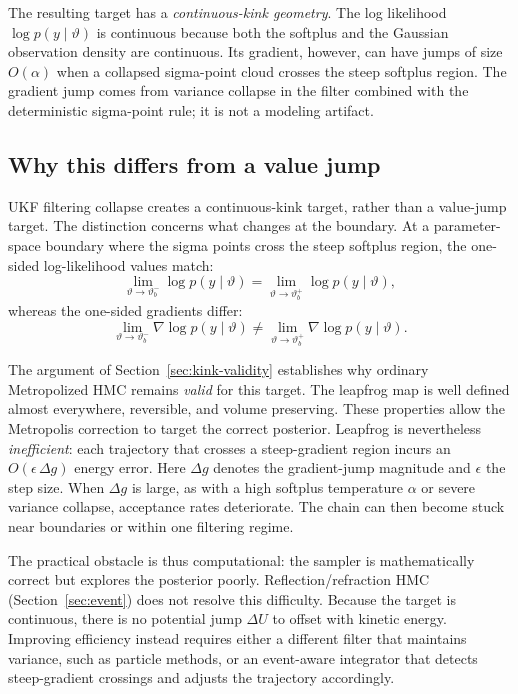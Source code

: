 \documentclass[11pt]{article}
\begin{document}
The resulting target has a \emph{continuous-kink geometry}. The log likelihood $\log p(y\mid\vartheta)$ is continuous because both the softplus and the Gaussian observation density are continuous. Its gradient, however, can have jumps of size $O(\alpha)$ when a collapsed sigma-point cloud crosses the steep softplus region. The gradient jump comes from variance collapse in the filter combined with the deterministic sigma-point rule; it is not a modeling artifact.

\subsection{Why this differs from a value jump}\label{sec:kink-vs-jump-ukf}

UKF filtering collapse creates a continuous-kink target, rather than a value-jump target. The distinction concerns what changes at the boundary. At a parameter-space boundary where the sigma points cross the steep softplus region, the one-sided log-likelihood values match:
\[
 \lim_{\vartheta\to\vartheta_b^-}\log p(y\mid\vartheta)
 = \lim_{\vartheta\to\vartheta_b^+}\log p(y\mid\vartheta),
\]
whereas the one-sided gradients differ:
\[
 \lim_{\vartheta\to\vartheta_b^-}\nabla\log p(y\mid\vartheta)
 \ne \lim_{\vartheta\to\vartheta_b^+}\nabla\log p(y\mid\vartheta).
\]

The argument of Section~\ref{sec:kink-validity} establishes why ordinary Metropolized HMC remains \emph{valid} for this target. The leapfrog map is well defined almost everywhere, reversible, and volume preserving. These properties allow the Metropolis correction to target the correct posterior. Leapfrog is nevertheless \emph{inefficient}: each trajectory that crosses a steep-gradient region incurs an $O(\epsilon\,\Delta
g)$ energy error. Here $\Delta g$ denotes the gradient-jump magnitude and $\epsilon$ the step size. When $\Delta g$ is large, as with a high softplus temperature $\alpha$ or severe variance collapse, acceptance rates deteriorate. The chain can then become stuck near boundaries or within one filtering regime.

The practical obstacle is thus computational: the sampler is mathematically correct but explores the posterior poorly. Reflection/refraction HMC (Section~\ref{sec:event}) does not resolve this difficulty. Because the target is continuous, there is no potential jump $\Delta U$ to offset with kinetic energy. Improving efficiency instead requires either a different filter that maintains variance, such as particle methods, or an event-aware integrator that detects steep-gradient crossings and adjusts the trajectory accordingly.
\end{document}
